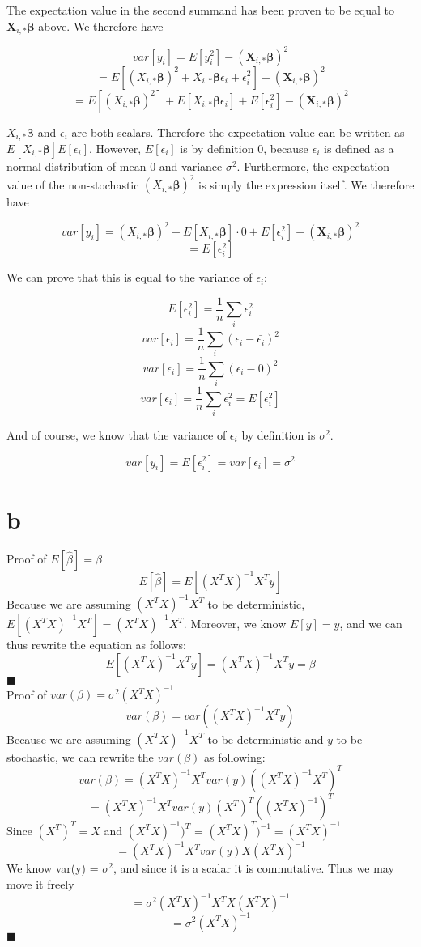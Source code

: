 \documentclass{article}
\begin{document}
The expectation value in the second summand has been proven to be equal 
to $\bm{X}_{i,*}\bm{\beta}$ above. We therefore have

\[ var[y_i] = E[y_i^2] - (\bm{X}_{i,*}\bm{\beta})^2 \]
\[ = E\left[(X_{i,*}\bm{\beta})^2 + X_{i,*}\bm{\beta}\epsilon_i + \epsilon_i^2\right] - (\bm{X}_{i,*}\bm{\beta})^2 \]
\[ = E\left[(X_{i,*}\bm{\beta})^2\right] + E[X_{i,*}\bm{\beta}\epsilon_i] + E[\epsilon_i^2] - (\bm{X}_{i,*}\bm{\beta})^2 \]

$X_{i,*}\bm{\beta}$ and $\epsilon_i$ are both scalars. Therefore the expectation value can be written as
$E[X_{i,*}\bm{\beta}]E[\epsilon_i]$. However, $E[\epsilon_i]$ is by definition $0$, because $\epsilon_i$ is
defined as a normal distribution of mean $0$ and variance $\sigma^2$. Furthermore, the expectation value of the
non-stochastic $(X_{i,*}\bm{\beta})^2$ is simply the expression itself. We therefore have

\[ var[y_i] = (X_{i,*}\bm{\beta})^2 + E[X_{i,*}\bm{\beta}]\cdot 0 + E[\epsilon_i^2] - (\bm{X}_{i,*}\bm{\beta})^2 \]
\[ = E[\epsilon_i^2] \]

We can prove that this is equal to the variance of $\epsilon_i$:

\[ E[\epsilon_i^2] = \frac{1}{n} \sum_i \epsilon_i^2\]
\[ var[\epsilon_i] = \frac{1}{n} \sum_i (\epsilon_i - \bar{\epsilon_i})^2\]
\[ var[\epsilon_i] = \frac{1}{n} \sum_i (\epsilon_i - 0)^2\]
\[ var[\epsilon_i] = \frac{1}{n} \sum_i \epsilon_i^2 = E[\epsilon_i^2] \]

And of course, we know that the variance of $\epsilon_i$ by definition is $\sigma^2$.

\[ var[y_i] = E[\epsilon_i^2] = var[\epsilon_i] = \sigma^2 \]

\section{b}

Proof of $E[\hat{\beta}] = \beta$
$$E[\hat{\beta}] = E[(X^{T}X)^{-1}X^{T}y]$$
Because we are assuming $(X^{T}X)^{-1}X^{T}$ to be deterministic, $E[(X^{T}X)^{-1}X^{T}] = (X^{T}X)^{-1}X^{T}$. Moreover, we know $E[y] = y$, and we can thus rewrite the equation as follows:
$$E[(X^{T}X)^{-1}X^{T}y] = (X^{T}X)^{-1}X^{T}y = \beta$$
$\blacksquare$
\\

Proof of $var(\beta) = \sigma^{2}(X^{T}X)^{-1}$
$$var(\beta) = var((X^{T}X)^{-1}X^{T}y)$$
Because we are assuming $(X^{T}X)^{-1}X^{T}$ to be deterministic and $y$ to be stochastic, we can rewrite the $var(\beta)$ as following:
$$var(\beta) = (X^{T}X)^{-1}X^{T}var(y)((X^{T}X)^{-1}X^{T})^{T}$$
$$ = (X^{T}X)^{-1}X^{T}var(y)(X^{T})^{T}((X^{T}X)^{-1})^{T}$$
Since $(X^{T})^{T} = X$ and $(X^{T}X)^{-1})^{T}$ = $(X^{T}X)^{T})^{-1} = (X^{T}X)^{-1}$
$$ = (X^{T}X)^{-1}X^{T}var(y)X(X^{T}X)^{-1} $$
We know var(y) = $\sigma^{2}$, and since it is a scalar it is commutative. Thus we may move it freely
$$ = \sigma^{2}(X^{T}X)^{-1}X^{T}X(X^{T}X)^{-1} $$
$$ = \sigma^{2}(X^{T}X)^{-1} $$
$\blacksquare$
\end{document}
